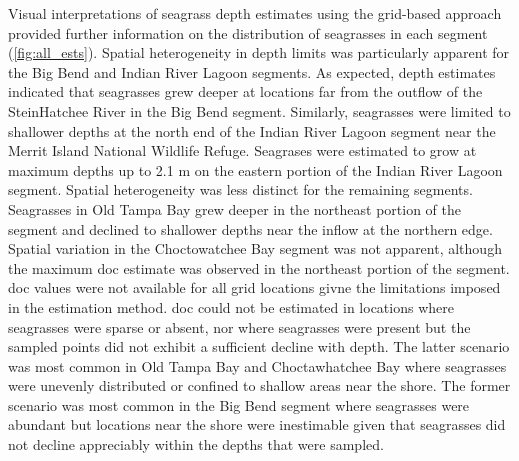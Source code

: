 \documentclass[letterpaper,12pt,oneside]{article}\usepackage[]{graphicx}\usepackage[]{color}
\begin{document}
Visual interpretations of seagrass depth estimates using the grid-based approach provided further information on the distribution of seagrasses in each segment (\cref{fig:all_ests}).  Spatial heterogeneity in depth limits was particularly apparent for the Big Bend and Indian River Lagoon segments.  As expected, depth estimates indicated that seagrasses grew deeper at locations far from the outflow of the SteinHatchee River in the Big Bend segment.  Similarly, seagrasses were limited to shallower depths at the north end of the Indian River Lagoon segment near the Merrit Island National Wildlife Refuge. Seagrases were estimated to grow at maximum depths up to 2.1 m on the eastern portion of the Indian River Lagoon segment.  Spatial heterogeneity was less distinct for the remaining segments.  Seagrasses in Old Tampa Bay grew deeper in the northeast portion of the segment and declined to shallower depths near the inflow at the northern edge.  Spatial variation in the Choctowatchee Bay segment was not apparent, although the maximum \ac{doc} estimate was observed in the northeast portion of the segment.  \ac{doc} values were not available for all grid locations givne the limitations imposed in the estimation method.  \ac{doc} could not be estimated in locations where seagrasses were sparse or absent, nor where seagrasses were present but the sampled points did not exhibit a sufficient decline with depth.  The latter scenario was most common in Old Tampa Bay and Choctawhatchee Bay where seagrasses were unevenly distributed or confined to shallow areas near the shore.  The former scenario was most common in the Big Bend segment where seagrasses were abundant but locations near the shore were inestimable given that seagrasses did not decline appreciably within the depths that were sampled.   
\end{document}
